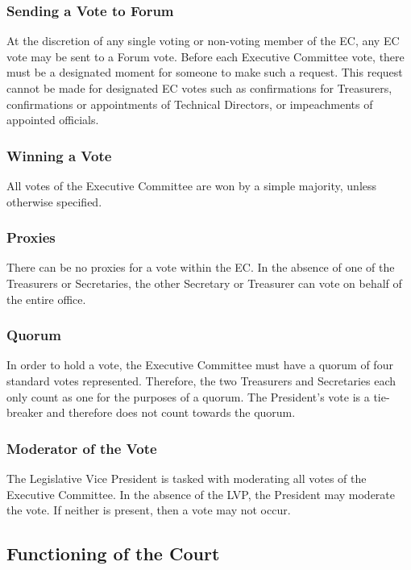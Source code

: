 \documentclass[USletter,12pt]{article}
\begin{document}
\begin{enumerate}[(a)]
\subsubsection{Sending a Vote to Forum}
At the discretion of any single voting or non-voting member of the EC, any EC vote may be sent to a Forum vote.  Before each Executive Committee vote, there must be a designated moment for someone to make such a request.  This request cannot be made for designated EC votes such as confirmations for Treasurers, confirmations or appointments of Technical Directors, or impeachments of appointed officials.

\subsubsection{Winning a Vote}
All votes of the Executive Committee are won by a simple majority, unless otherwise specified.

\subsubsection{Proxies}
There can be no proxies for a vote within the EC.  In the absence of one of the Treasurers or Secretaries, the other Secretary or Treasurer can vote on behalf of the entire office.

\subsubsection{Quorum}
In order to hold a vote, the Executive Committee must have a quorum of four standard votes represented.  Therefore, the two Treasurers and Secretaries each only count as one for the purposes of a quorum.  The President's vote is a tie-breaker and therefore does not count towards the quorum.

\subsubsection{Moderator of the Vote}
The Legislative Vice President is tasked with moderating all votes of the Executive Committee.  In the absence of the LVP, the President may moderate the vote.  If neither is present, then a vote may not occur.


\subsection{Functioning of the Court}



\end{enumerate}
\end{document}
